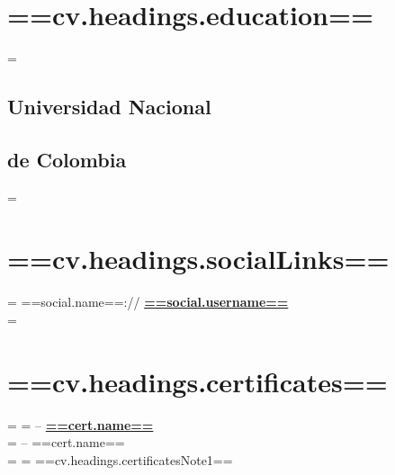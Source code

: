\documentclass[]{CV-JuanCamiloFlorez}
\begin{document}
%
%
\lastupdated

%
%

%
%
\begin{minipage}[t]{0.33\textwidth} 

\section{==cv.headings.education==} 
=%
\subsection{Universidad Nacional}
\subsection{de Colombia}
=%
\sectionsep

\section{==cv.headings.socialLinks==}
=%
    ==social.name==:// \href{==social.url==}{\bf ==social.username==} \\
=%
\sectionsep

\section{==cv.headings.certificates==}
=%
=%
-- \textbf{\href{==cert.url==}{==cert.name==}} \\
=%
-- ==cert.name== \\
=%
=%
\smallskip
\scriptsize{==cv.headings.certificatesNote1==}
\sectionsep


\end{minipage}
\end{document}
